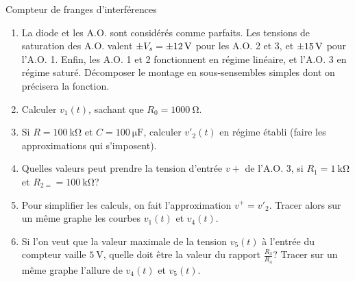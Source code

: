 \documentclass[french, a4paper, 11pt]{article}
\begin{document}
\begin{cadre}{Compteur de franges d'interférences}
  \begin{enumerate}[label=\upshape\alph*)]
    \item La diode et les A.O. sont considérés comme parfaits. Les tensions de saturation des A.O. valent \(\pm V_{s} = \SI{\pm 12}{\volt}\) pour les A.O. 2 et 3, et \(\SI{\pm 15}{\volt}\) pour l'A.O. 1. Enfin, les A.O. 1 et 2 fonctionnent en régime linéaire, et l'A.O. 3 en régime saturé. Décomposer le montage en sous-sensembles simples dont on précisera la fonction.
    \item Calculer \(v_{1}(t)\), sachant que \(R_{0}=\SI{1000}{\ohm}\).
    \item Si \(R=\SI{100}{\kilo\ohm}\) et \(C=\SI{100}{\micro\farad}\), calculer \(v'_{2}(t)\) en régime établi (faire les approximations qui s'imposent).
    \item Quelles valeurs peut prendre la tension d'entrée \(v+\) de l'A.O. 3, si \(R_{1}=\SI{1}{\kilo\ohm}\) et \(R_{2=}=\SI{100}{\kilo\ohm}\)?
    \item Pour simplifier les calculs, on fait l'approximation \(v^{+}=v'_{2}\). Tracer alors sur un même graphe les courbes \(v_{1}(t)\) et \(v_{4}(t)\).
    \item Si l'on veut que la valeur maximale de la tension \(v_{5}(t)\) à l'entrée du compteur vaille \(\SI{5}{\volt}\), quelle doit être la valeur du rapport \(\frac{R_{3}}{R_{4}}\)? Tracer sur un même graphe l'allure de \(v_{4}(t)\) et \(v_{5}(t)\).
  \end{enumerate}
\end{cadre}
\end{document}
